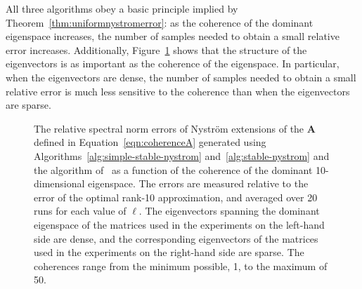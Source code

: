 \documentclass[11pt,letterpaper,twoside,reqno,nosumlimits]{amsart}
\newcommand{\mat}[1]{\ensuremath{\mathbf{#1}}}
\theoremstyle{remark}
\begin{document}
All three algorithms obey a basic principle implied by Theorem~\ref{thm:uniformnystromerror}: as the coherence of the dominant eigenspace increases, the number of samples needed to obtain a small relative error increases. Additionally, Figure~\ref{fig:vary-coherence} shows that the structure of the eigenvectors is as important as the coherence of the eigenspace. In particular, when the eigenvectors are dense, the number of samples needed to obtain a small relative error is much less sensitive to the coherence than when the eigenvectors are sparse. 

\begin{figure}[hp]
\centering



\caption{The relative spectral norm errors of Nystr\"om extensions of the $\mat{A}$ defined in Equation~\ref{eqn:coherenceA} generated using Algorithms~\ref{alg:simple-stable-nystrom} and~\ref{alg:stable-nystrom} and the algorithm of~\cite{CD11} as a function of the coherence of the dominant 10-dimensional eigenspace. The errors are measured relative to the error of the optimal rank-10 approximation, and averaged over 20 runs for each value of $\ell.$ The eigenvectors spanning the dominant eigenspace of the matrices used in the experiments on the left-hand side are dense, and the corresponding eigenvectors of the matrices used in the experiments on the right-hand side are sparse. The coherences range from the minimum possible, 1, to the maximum of 50.}
\label{fig:vary-coherence}
\end{figure}
\end{document}

